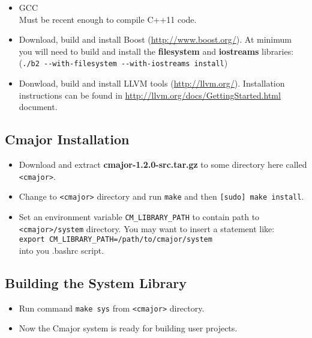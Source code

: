 \documentclass[oneside, a4paper, 11pt]{article}
\begin{document}
\begin{itemize}

\item
GCC\\
Must be recent enough to compile C++11 code.

\item
Download, build and install Boost (\url{http://www.boost.org/}).
At minimum you will need to build and install the
\textbf{filesystem} and \textbf{iostreams} libraries:\\
(\verb|./b2 --with-filesystem --with-iostreams install|)

\item
Donwload, build and install LLVM tools (\url{http://llvm.org/}).
Installation instructions can be found in \url{http://llvm.org/docs/GettingStarted.html} document.

\end{itemize}

\subsection{Cmajor Installation}

\begin{itemize}

\item
Download and extract \textbf{cmajor-1.2.0-src.tar.gz} to some directory here called \verb|<cmajor>|.

\item
Change to \verb|<cmajor>| directory and run \verb|make| and then \verb|[sudo] make install|.

\item
Set an environment variable \verb|CM_LIBRARY_PATH| to contain path to \verb|<cmajor>/system| directory.
You may want to insert a statement like:\\
\verb|export CM_LIBRARY_PATH=/path/to/cmajor/system|\\
into you .bashrc script.

\end{itemize}

\subsection{Building the System Library}

\begin{itemize}

\item
Run command \verb|make sys| from \verb|<cmajor>| directory.

\item
Now the Cmajor system is ready for building user projects.

\end{itemize}
\end{document}
